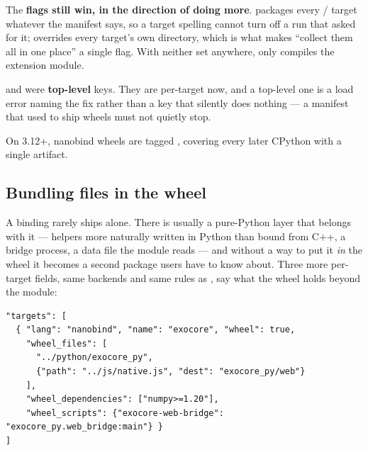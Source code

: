 The \textbf{flags still win, in the direction of doing more}. 
packages every  /  target whatever the manifest
says, so a target spelling  cannot turn off a run that
asked for it;  overrides every target's own directory,
which is what makes ``collect them all in one place'' a single flag. With
neither set anywhere,  only compiles the extension module.

\begin{warn}
 and  were \textbf{top-level} keys. They are
per-target now, and a top-level one is a load error naming the fix rather than
a key that silently does nothing --- a manifest that used to ship wheels must
not quietly stop.
\end{warn}

\begin{note}
On 3.12+, nanobind wheels are tagged , covering every later CPython
with a single artifact.
\end{note}

\subsection{Bundling files in the wheel}
\label{sec:wheelfiles}

A binding rarely ships alone. There is usually a pure-Python layer that
belongs with it --- helpers more naturally written in Python than bound from
C++, a bridge process, a data file the module reads --- and without a way to
put it \emph{in} the wheel it becomes a second package users have to know
about. Three more per-target fields, same backends and same rules as
, say what the wheel holds beyond the module:

\begin{lstlisting}[style=json]
"targets": [
  { "lang": "nanobind", "name": "exocore", "wheel": true,
    "wheel_files": [
      "../python/exocore_py",
      {"path": "../js/native.js", "dest": "exocore_py/web"}
    ],
    "wheel_dependencies": ["numpy>=1.20"],
    "wheel_scripts": {"exocore-web-bridge": "exocore_py.web_bridge:main"} }
]
\end{lstlisting}

